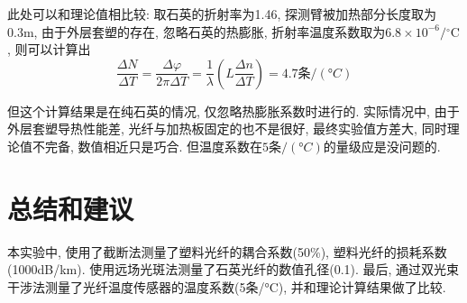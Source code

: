 \documentclass[12pt,a4paper]{article}
\begin{document}
此处可以和理论值相比较: 取石英的折射率为1.46, 探测臂被加热部分长度取为0.3m, 由于外层套塑的存在, 忽略石英的热膨胀, 
折射率温度系数取为$6.8 \times 10^{-6} /{ }^{\circ} \mathrm{C}$, 则可以计算出
\begin{equation}
    \frac{\Delta N}{\Delta T} = \frac{\Delta \varphi}{2 \pi \Delta T} = \frac{1}{\lambda}\left(L \frac{\Delta n}{\Delta T}\right) =4.7\text{条}/(°C)
 \end{equation}

但这个计算结果是在纯石英的情况, 仅忽略热膨胀系数时进行的. 实际情况中, 由于外层套塑导热性能差, 光纤与加热板固定的也不是很好, 最终实验值方差大, 同时理论值不完备, 数值相近只是巧合. 
但温度系数在$5\text{条}/(°C)$的量级应是没问题的. 
\section{总结和建议}
本实验中, 使用了截断法测量了塑料光纤的耦合系数(50\%), 塑料光纤的损耗系数(1000dB/km). 使用远场光斑法测量了石英光纤的数值孔径(0.1). 
最后, 通过双光束干涉法测量了光纤温度传感器的温度系数(5条/°C), 并和理论计算结果做了比较. 
\end{document}
